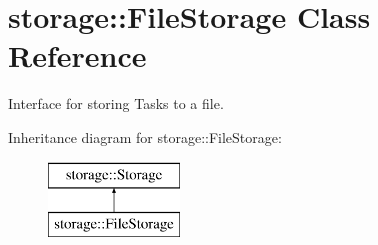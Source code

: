 \hypertarget{classstorage_1_1FileStorage}{
\section{storage\-:\-:\-File\-Storage \-Class \-Reference}
\label{classstorage_1_1FileStorage}
}


\-Interface for storing \-Tasks to a file.  


\-Inheritance diagram for storage\-:\-:\-File\-Storage\-:\begin{figure}[H]
\begin{center}
\leavevmode
\includegraphics[height=2.000000cm]{classstorage_1_1FileStorage}
\end{center}
\end{figure}
